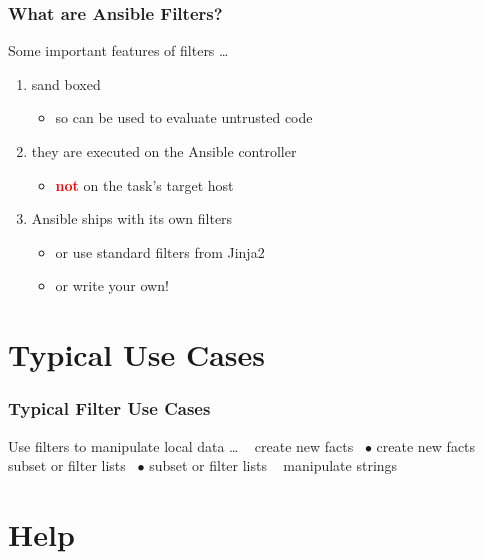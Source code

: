 \documentclass[pdf]{beamer}
\begin{document}
\begin{frame}
  \frametitle{What are Ansible Filters?}
  Some important features of filters \ldots
  \pause{}
  \begin{enumerate}
    \item<+->{sand boxed}
      \begin{itemize}
        \item<+->{so can be used to evaluate untrusted code}
      \end{itemize}
    \item<+->{they are executed on the Ansible controller}
      \begin{itemize}
        \item<+->{\textcolor{red}{\textbf{not}} on the task's target host}
      \end{itemize}
    \item<+->{Ansible ships with its own filters}
      \begin{itemize}
        \item<+->{or use standard filters from Jinja2}
        \item<+->{or write your own!}
      \end{itemize}
  \end{enumerate}
\end{frame}

\section{Typical Use Cases}

\begin{frame}[t,fragile]
  \frametitle{Typical Filter Use Cases}
   {Use filters to manipulate local data \ldots \newline}
    {\-\ \color{blue}{\small$\bullet$} create new facts}
    {}
   {\-\ \small{\color{blue}$\bullet$} create new facts \newline}
    {\-\ \color{blue}{\small$\bullet$} subset or filter lists}
    {}
   {\-\ \small{\color{blue}$\bullet$} subset or filter lists \newline}
    {\-\ \color{blue}{\small$\bullet$} manipulate strings}
    {}
\end{frame}

\section{Help}
\end{document}

